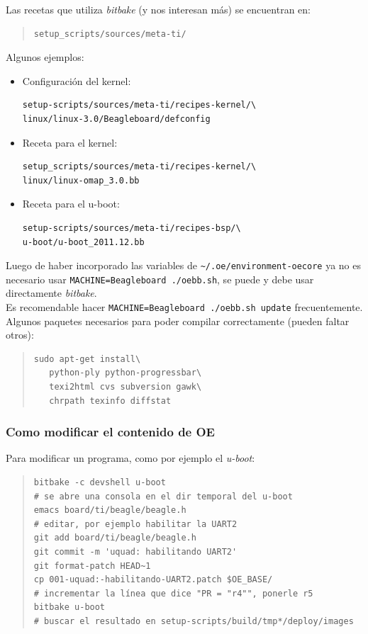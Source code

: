 \documentclass[main]{subfiles}
\begin{document}
Las recetas que utiliza \textit{bitbake} (y nos interesan más) se encuentran en:
\begin{quote}
\begin{verbatim}
setup_scripts/sources/meta-ti/
\end{verbatim}
\end{quote}
Algunos ejemplos:
\begin{itemize}
\item Configuración del kernel:
\begin{verbatim}
setup-scripts/sources/meta-ti/recipes-kernel/\
linux/linux-3.0/Beagleboard/defconfig
\end{verbatim}
\item Receta para el kernel:
\begin{verbatim}
setup_scripts/sources/meta-ti/recipes-kernel/\
linux/linux-omap_3.0.bb
\end{verbatim}
\item Receta para el u-boot:
\begin{verbatim}
setup-scripts/sources/meta-ti/recipes-bsp/\
u-boot/u-boot_2011.12.bb
\end{verbatim}
\end{itemize}

Luego de haber incorporado las variables de \verb+~/.oe/environment-oecore+ ya no es necesario usar \verb+MACHINE=Beagleboard ./oebb.sh+, se puede y debe usar directamente \textit{bitbake}.\\

Es recomendable hacer \verb+MACHINE=Beagleboard ./oebb.sh update+ frecuentemente.
Algunos paquetes necesarios para poder compilar correctamente (pueden faltar otros):
\begin{quote}
\begin{verbatim}
sudo apt-get install\
   python-ply python-progressbar\
   texi2html cvs subversion gawk\
   chrpath texinfo diffstat
\end{verbatim}
\end{quote}

\subsubsection{Como modificar el contenido de OE}
\label{sec:codigo:como-modificar-el-contenido-de-oe}

Para modificar un programa, como por ejemplo el \textit{u-boot}:
\begin{quote}
\begin{verbatim}
bitbake -c devshell u-boot
# se abre una consola en el dir temporal del u-boot
emacs board/ti/beagle/beagle.h
# editar, por ejemplo habilitar la UART2
git add board/ti/beagle/beagle.h
git commit -m 'uquad: habilitando UART2'
git format-patch HEAD~1
cp 001-uquad:-habilitando-UART2.patch $OE_BASE/
# incrementar la línea que dice "PR = "r4"", ponerle r5
bitbake u-boot
# buscar el resultado en setup-scripts/build/tmp*/deploy/images
\end{verbatim}
\end{quote}
\end{document}

